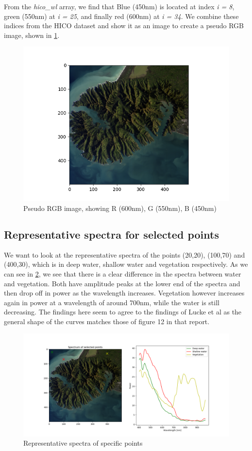 From the \textit{hico\_wl} array, we find that Blue (450nm) is located at index \textit{i = 8}, 
green (550nm) at \textit{i = 25}, and finally red (600nm) at \textit{i = 34}. We combine these indices from 
the HICO dataset and show it as an image to create a pseudo RGB image, shown in \cref{fig:pseudo_rgb}.


\begin{figure}
    \centering
    \includegraphics[width=\textwidth]{../fig/pseudo_rgb.png}
    \caption{Pseudo RGB image, showing R (600nm), G (550nm), B (450nm)}
    \label{fig:pseudo_rgb}
\end{figure}

\subsection{Representative spectra for selected points}

We want to look at the representative spectra of the points (20,20), (100,70) and (400,30), which is in deep water, shallow water 
and vegetation respectively.
As we can see in \cref{fig:point_spectra}, we see that there is a clear difference in the spectra between water and vegetation. 
Both have amplitude peaks at the lower end of the spectra and then drop off in power as the wavelength increases. Vegetation however increases
again in power at a wavelength of around 700nm, while the water is still decreasing. 
The findings here seem to agree to the findings of Lucke et al \cite{Lucke:11} as the general shape of the curves matches those of figure 12 in 
that report. 


\begin{figure}
    \centering
    \includegraphics[width=\textwidth]{../fig/pseudo_rgb_points.png}
    \caption{Representative spectra of specific points}
    \label{fig:point_spectra}
\end{figure}

